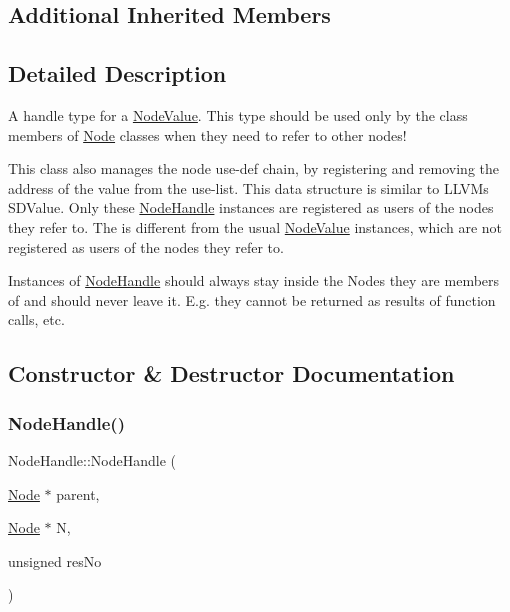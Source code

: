 \subsection*{Additional Inherited Members}


\subsection{Detailed Description}
A handle type for a \hyperlink{structglow_1_1_node_value}{Node\+Value}. This type should be used only by the class members of \hyperlink{classglow_1_1_node}{Node} classes when they need to refer to other nodes!

This class also manages the node use-\/def chain, by registering and removing the address of the value from the use-\/list. This data structure is similar to L\+L\+VM\textquotesingle{}s S\+D\+Value. Only these \hyperlink{structglow_1_1_node_handle}{Node\+Handle} instances are registered as users of the nodes they refer to. The is different from the usual \hyperlink{structglow_1_1_node_value}{Node\+Value} instances, which are not registered as users of the nodes they refer to.

Instances of \hyperlink{structglow_1_1_node_handle}{Node\+Handle} should always stay inside the Nodes they are members of and should never leave it. E.\+g. they cannot be returned as results of function calls, etc. 

\subsection{Constructor \& Destructor Documentation}
\mbox{\label{structglow_1_1_node_handle_ada61f6b4c842e7911d221dac609c69c2}} 
\subsubsection{\texorpdfstring{Node\+Handle()}{NodeHandle()}}
{\footnotesize\ttfamily Node\+Handle\+::\+Node\+Handle (\begin{DoxyParamCaption}\item[{\hyperlink{classglow_1_1_node}{Node} $\ast$}]{parent,  }\item[{\hyperlink{classglow_1_1_node}{Node} $\ast$}]{N,  }\item[{unsigned}]{res\+No }\end{DoxyParamCaption})}

